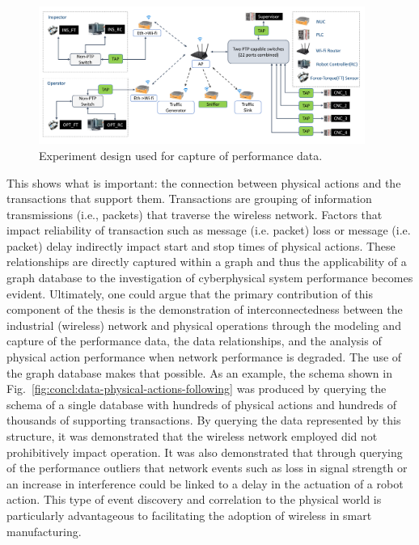 \begin{figure}[!ht]
	\centering
	\includegraphics[width=0.95\textwidth]{chapter-gdb-appl/figures/Fig1TiiSpecialDiagram-testbed2.png}
	\caption{Experiment design used for capture of performance data.}
	\label{fig:concl:experiment-design}
\end{figure}

This shows what is important: the connection between physical actions and the transactions that support them.  Transactions are grouping of information transmissions (i.e., packets) that traverse the wireless network.  Factors that impact reliability of transaction such as message (i.e. packet) loss or message (i.e. packet) delay indirectly impact start and stop times of physical actions.  These relationships are directly captured within a graph and thus the applicability of a graph database to the investigation of cyberphysical system performance becomes evident.  Ultimately, one could argue that the primary contribution of this component of the thesis is the demonstration of interconnectedness between the industrial (wireless) network and physical operations through the modeling and capture of the performance data, the data relationships, and the analysis of physical action performance when network performance is degraded.  The use of the graph database makes that possible.  As an example, the schema shown in Fig.~\ref{fig:concl:data-physical-actions-following} was produced by querying the schema of a single database with hundreds of physical actions and hundreds of thousands of supporting transactions.  By querying the data represented by this structure, it was demonstrated that the wireless network employed did not prohibitively impact operation.  It was also demonstrated that through querying of the performance outliers that network events such as loss in signal strength or an increase in interference could be linked to a delay in the actuation of a robot action.  This type of event discovery and correlation to the physical world is particularly advantageous to facilitating the adoption of wireless in smart manufacturing.

